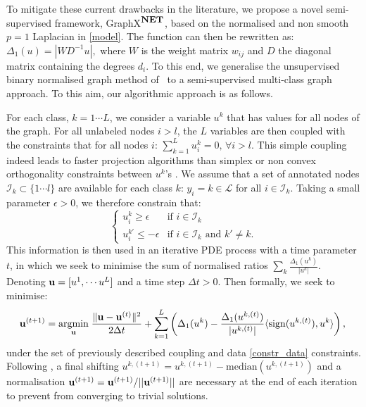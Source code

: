 \documentclass[runningheads]{llncs}
\DeclareMathOperator{\sign}{sign}
\DeclareMathOperator{\argmin}{argmin}
\newcommand{\uargmin}[1]{\underset{#1}{\argmin}\;}
\begin{document}
To mitigate these current drawbacks in the literature, we propose a novel semi-supervised framework, GraphX$^\textbf{\small NET}$, based on the normalised and non smooth $p=1$ Laplacian in \eqref{model}. The function can then be rewritten as: $\Delta_1(u)=|WD^{-1}u|,$ where $W$ is the weight matrix $w_{ij}$ and $D$ the diagonal matrix containing the degrees $d_i$. To this end, we generalise the unsupervised binary normalised graph method of~\cite{Feld2019} to a semi-supervised multi-class graph approach. To this aim, our algorithmic approach is as follows.

For each class, $k=1\cdots L$, we consider a variable $u^k$ that has values for all nodes of the graph. For all unlabeled nodes $i>l$, the $L$ variables are then coupled with the constraints that for all nodes $i$:
$\sum_{k=1}^L u^k_i=0,\, \forall i>l.$
This simple coupling indeed leads to faster projection algorithms than simplex  \cite{bresson2013multiclass,gao2015medical} or non convex orthogonality constraints between $u^k$'s \cite{dodero2014group}. We assume that a set of annotated nodes $\mathcal I_k\subset\{1\cdots l\}$ are available for each class $k$: $y_i=k\in\mathcal{L}$ for all $i\in\mathcal{I}_k$. Taking a small parameter $\epsilon>0$, we therefore constrain that:
\begin{equation}\label{constr_data}
\left\{\begin{array}{ll}
u^k_i\geq \epsilon&\textrm{if }i\in\mathcal I_k\\
u^{k'}_i\leq -\epsilon&\textrm{if }i\in\mathcal I_k \textrm{ and }k'\neq k.
\end{array}
\right.
\end{equation}
This information is then used in an iterative PDE process with a time parameter $t$, in which we seek to minimise the  sum of normalised ratios $\sum_k \frac{\Delta_1 (u^k)}{|u^k|}$.  Denoting ${\bf u}= [u^1,\cdots u^L]$ and a time step $\Delta t>0$. Then formally, we seek to minimise:
\begin{equation}\label{pde}
{\bf u}^{(t+1)}=\uargmin{{\bf u}} \frac{\| {\bf u}-{\bf u}^{(t)}\|^2}{2\Delta t}+\sum_{k=1}^L\left( \Delta_1(u^k)-\frac{\Delta_1 (u^{k,(t)})}{|u^{k,(t)}|}\langle \sign(u^{k,(t)}), u^k\rangle \right),\\
\end{equation}
under the set of   previously described coupling  and data \eqref{constr_data} constraints.
Following \cite{hein2013total,Feld2019}, a final shifting ${u}^{k,(t+1)}={u}^{k,(t+1)}-\textrm{median}({u}^{k,(t+1)})$ and  a  normalisation ${\bf u}^{(t+1)}={\bf u}^{(t+1)}/||{\bf u}^{(t+1)}||$ are necessary at the end of each iteration to prevent from converging to trivial solutions.
\end{document}
